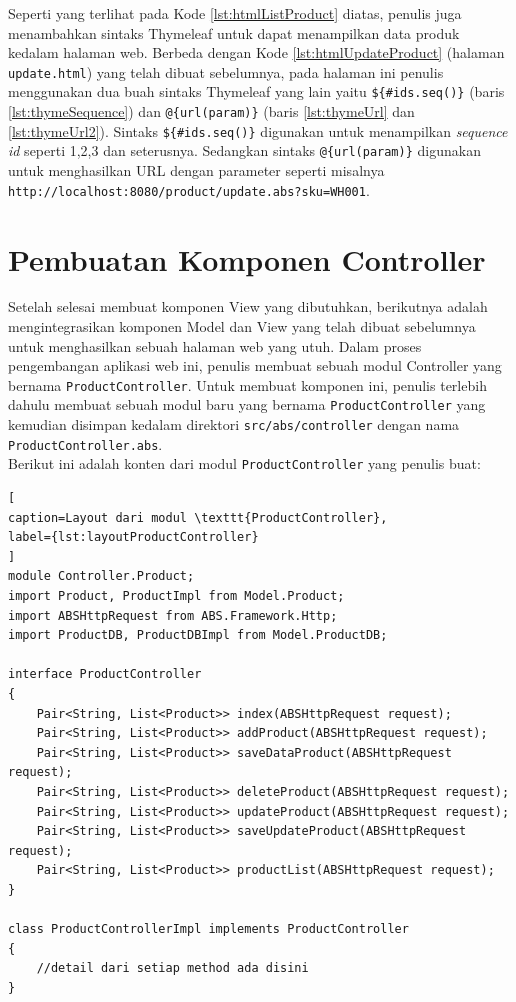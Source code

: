 Seperti yang terlihat pada Kode \ref{lst:htmlListProduct} diatas, penulis juga menambahkan sintaks Thymeleaf untuk dapat menampilkan data produk kedalam halaman web. Berbeda dengan Kode \ref{lst:htmlUpdateProduct} (halaman \texttt{update.html}) yang telah dibuat sebelumnya, pada halaman ini penulis menggunakan dua buah sintaks Thymeleaf yang lain yaitu \texttt{\$\{\#ids.seq()\}} (baris \ref{lst:thymeSequence}) dan \texttt{@\{url(param)\}} (baris \ref{lst:thymeUrl} dan \ref{lst:thymeUrl2}). Sintaks \texttt{\$\{\#ids.seq()\}} digunakan untuk menampilkan \textit{sequence id} seperti 1,2,3 dan seterusnya. Sedangkan sintaks \texttt{@\{url(param)\}} digunakan untuk menghasilkan URL dengan parameter seperti misalnya \texttt{http://localhost:8080/product/update.abs?sku=WH001}.

\section{Pembuatan Komponen Controller}

Setelah selesai membuat komponen View yang dibutuhkan, berikutnya adalah mengintegrasikan komponen Model dan View yang telah dibuat sebelumnya untuk menghasilkan sebuah halaman web yang utuh. Dalam proses pengembangan aplikasi web ini, penulis membuat sebuah modul Controller yang bernama \texttt{ProductController}. Untuk membuat komponen ini, penulis terlebih dahulu membuat sebuah modul baru yang bernama \texttt{ProductController} yang kemudian disimpan kedalam direktori \texttt{src/abs/controller} dengan nama \texttt{ProductController.abs}.\\

Berikut ini adalah konten dari modul \texttt{ProductController} yang penulis buat:

\begin{lstlisting}[
caption=Layout dari modul \texttt{ProductController},
label={lst:layoutProductController}
]
module Controller.Product;
import Product, ProductImpl from Model.Product;
import ABSHttpRequest from ABS.Framework.Http;
import ProductDB, ProductDBImpl from Model.ProductDB;

interface ProductController
{
	Pair<String, List<Product>> index(ABSHttpRequest request);
	Pair<String, List<Product>> addProduct(ABSHttpRequest request);
	Pair<String, List<Product>> saveDataProduct(ABSHttpRequest request);
	Pair<String, List<Product>> deleteProduct(ABSHttpRequest request);
	Pair<String, List<Product>> updateProduct(ABSHttpRequest request);
	Pair<String, List<Product>> saveUpdateProduct(ABSHttpRequest request);
	Pair<String, List<Product>> productList(ABSHttpRequest request);
}

class ProductControllerImpl implements ProductController
{
	//detail dari setiap method ada disini
}
\end{lstlisting}

